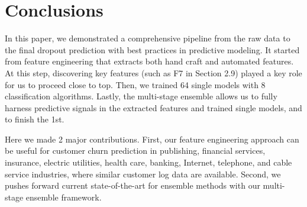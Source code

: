 \section{Conclusions}
In this paper, we demonstrated a comprehensive pipeline from the raw data to the final dropout prediction with best practices in  predictive modeling.  It started from feature engineering that extracts both hand craft and automated features.  At this step, discovering key features (such as F7 in Section 2.9) played a key role for us to proceed close to top. Then, we trained 64 single models with 8 classification algorithms. Lastly, the multi-stage ensemble allows us to fully harness predictive signals in the extracted features and trained single models, and to finish the 1st.

Here we made 2 major contributions.  First, our feature engineering approach can be useful for customer churn prediction in publishing, financial services, insurance, electric utilities, health care, banking, Internet, telephone, and cable service industries, where similar customer log data are available.  Second, we pushes forward current state-of-the-art for ensemble methods with our multi-stage ensemble framework.
